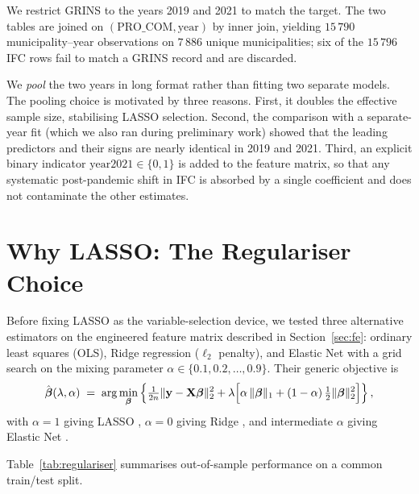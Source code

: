 \documentclass[11pt,a4paper]{article}
\begin{document}
We restrict GRINS to the years 2019 and 2021 to match the target. The
two tables are joined on \((\text{PRO\_COM}, \text{year})\) by inner
join, yielding \(15\,790\) municipality--year observations on
\(7\,886\) unique municipalities; six of the \(15\,796\) IFC rows fail
to match a GRINS record and are discarded.

We \emph{pool} the two years in long format rather than fitting two
separate models. The pooling choice is motivated by three reasons.
First, it doubles the effective sample size, stabilising LASSO
selection. Second, the comparison with a separate-year fit (which we
also ran during preliminary work) showed that the leading predictors
and their signs are nearly identical in 2019 and 2021. Third, an
explicit binary indicator \(\text{year2021} \in \{0,1\}\) is added to
the feature matrix, so that any systematic post-pandemic shift in IFC
is absorbed by a single coefficient and does not contaminate the other
estimates.

\section{Why LASSO: The Regulariser Choice}
\label{sec:regulariser}

Before fixing LASSO as the variable-selection device, we tested three
alternative estimators on the engineered feature matrix described in
Section~\ref{sec:fe}: ordinary least squares (OLS), Ridge regression
(\(\ell_{2}\) penalty), and Elastic Net with a grid search on the
mixing parameter \(\alpha \in \{0.1, 0.2, \ldots, 0.9\}\). Their
generic objective is
\begin{equation}
  \hat{\boldsymbol{\beta}}(\lambda,\alpha) \;=\;
  \arg\min_{\boldsymbol{\beta}}
  \left\{
    \tfrac{1}{2n}
    \lVert \mathbf{y} - \mathbf{X}\boldsymbol{\beta} \rVert_{2}^{2}
    + \lambda
    \Bigl[
      \alpha\,\lVert \boldsymbol{\beta} \rVert_{1}
      + (1-\alpha)\,\tfrac{1}{2}\lVert \boldsymbol{\beta} \rVert_{2}^{2}
    \Bigr]
  \right\},
  \label{eq:enet}
\end{equation}
with \(\alpha=1\) giving LASSO \citep{tibshirani1996}, \(\alpha=0\)
giving Ridge \citep{hoerlkennard1970}, and intermediate \(\alpha\)
giving Elastic Net \citep{zouhastie2005}.

Table~\ref{tab:regulariser} summarises out-of-sample performance on a
common train/test split.
\end{document}
